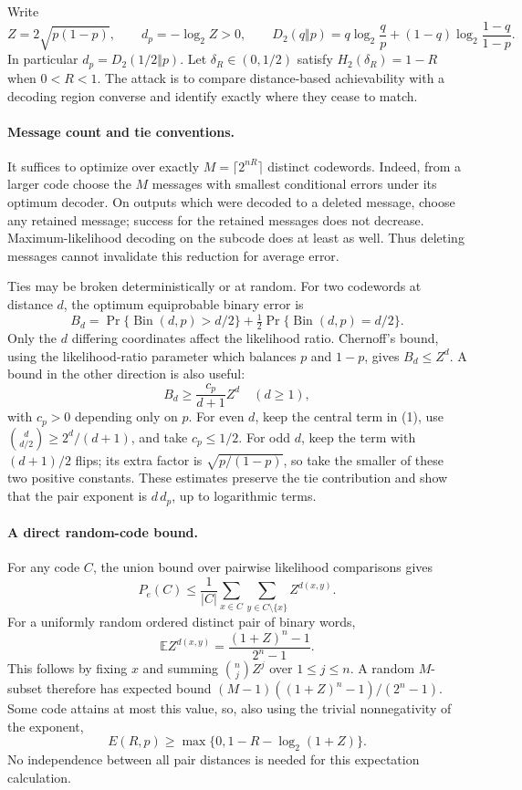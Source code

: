 \documentclass[11pt]{article}
\begin{document}
Write
\[
 Z=2\sqrt{p(1-p)},\qquad d_p=-\log_2 Z>0,
 \qquad D_2(q\Vert p)=q\log_2\frac qp+(1-q)\log_2\frac{1-q}{1-p}.
\]
In particular $d_p=D_2(1/2\Vert p)$. Let
$\delta_R\in(0,1/2)$ satisfy $H_2(\delta_R)=1-R$ when $0<R<1$.
The attack is to compare distance-based achievability with a decoding
region converse and identify exactly where they cease to match.

\paragraph{Message count and tie conventions.}
It suffices to optimize over exactly $M=\lceil2^{nR}\rceil$ distinct
codewords. Indeed, from a larger code choose the $M$ messages with
smallest conditional errors under its optimum decoder. On outputs
which were decoded to a deleted message, choose any retained message;
success for the retained messages does not decrease. Maximum-likelihood
decoding on the subcode does at least as well. Thus deleting messages
cannot invalidate this reduction for average error.

Ties may be broken deterministically or at random. For two codewords
at distance $d$, the optimum equiprobable binary error is
\[
 B_d=\Pr\{\operatorname{Bin}(d,p)>d/2\}
       +\tfrac12\Pr\{\operatorname{Bin}(d,p)=d/2\}.       \tag{1}
\]
Only the $d$ differing coordinates affect the likelihood ratio.
Chernoff's bound, using the likelihood-ratio parameter which balances
$p$ and $1-p$, gives $B_d\le Z^d$. A bound in the other direction
is also useful:
\[
                  B_d\ge \frac{c_p}{d+1}Z^d\quad(d\ge1), \tag{2}
\]
with $c_p>0$ depending only on $p$. For even $d$, keep the central term
in (1), use $\binom d{d/2}\ge2^d/(d+1)$, and take $c_p\le1/2$.
For odd $d$, keep the term with $(d+1)/2$ flips; its extra factor is
$\sqrt{p/(1-p)}$, so take the smaller of these two positive constants.
These estimates preserve the tie contribution and show that the pair
exponent is $d\,d_p$, up to logarithmic terms.

\paragraph{A direct random-code bound.}
For any code $C$, the union bound over pairwise likelihood comparisons
gives
\[
 P_e(C)\le\frac1{|C|}\sum_{x\in C}\sum_{y\in C\setminus\{x\}}Z^{d(x,y)}.
                                                               \tag{3}
\]
For a uniformly random ordered distinct pair of binary words,
\[
 \mathbb E Z^{d(x,y)}
       =\frac{(1+Z)^n-1}{2^n-1}.                         \tag{4}
\]
This follows by fixing $x$ and summing $\binom njZ^j$ over
$1\le j\le n$. A random $M$-subset therefore has expected bound
$(M-1)((1+Z)^n-1)/(2^n-1)$. Some code attains at most this value,
so, also using the trivial nonnegativity of the exponent,
\[
             E(R,p)\ge\max\{0,1-R-\log_2(1+Z)\}.        \tag{5}
\]
No independence between all pair distances is needed for this
expectation calculation.
\end{document}
